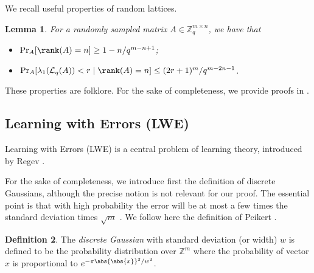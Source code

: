 \documentclass[11pt]{article}
\theoremstyle{definition}
\newtheorem{definition}{Definition}[section]
\theoremstyle{plain}
\newtheorem{lemma}[definition]{Lemma}
\theoremstyle{remark}
\newcommand{\LL}{\mathcal{L}}
\newcommand{\bZ}{\mathbb{Z}}
\begin{document}
We recall useful properties of random lattices. 

\begin{lemma}\label{lem:random-lattices}
  For a randomly sampled matrix $A \in \bZ_q^{m \times n}$, we have that
  \begin{itemize}
      \item[(i)] $\Pr_A[\rank(A) = n] \geq 1 - {n}/{q^{m-n+1}}$;
      \item[(ii)] $\Pr_A[\lambda_1(\LL_q(A)) < r \mid \rank(A) = n] \leq {(2r+1)^m}/{q^{m-2n-1}}$.
  \end{itemize}
\end{lemma}

These properties are folklore. For the sake of completeness, we provide proofs in .

\subsection{Learning with Errors (\textsc{LWE})}
\label{subsec:lwe}

Learning with Errors (LWE) is a central problem of learning theory, introduced by Regev \cite{regev2009lattices}. 

For the sake of completeness, we introduce first the definition of discrete Gaussians, although the precise notion is not relevant for our proof. The essential point is that with high probability the error will be at most a few times the standard deviation times $\sqrt{m}$ \cite{regev2009lattices, Micciancio2011}. We follow here the definition of Peikert \autocite[Section 2.3]{peikert2016decade}.

\begin{definition}
    The \emph{discrete Gaussian} with standard deviation (or width) $w$ is defined to be the probability distribution over $\bZ^m$ where the probability of vector $x$ is proportional to $e^{-\pi\abs{\abs{x}}^2/w^2}$.
\end{definition}
\end{document}
